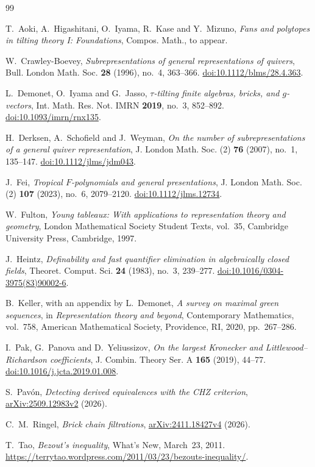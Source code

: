 \documentclass[a4paper,reqno,10pt]{amsart}
\theoremstyle{definition}
\numberwithin{equation}{section}
\begin{document}
\begin{thebibliography}{99}

T.~Aoki, A.~Higashitani, O.~Iyama, R.~Kase and Y.~Mizuno,
\emph{Fans and polytopes in tilting theory I: Foundations},
Compos. Math., to appear.

W.~Crawley-Boevey,
\emph{Subrepresentations of general representations of quivers},
Bull. London Math. Soc. \textbf{28} (1996), no.~4, 363--366.
\href{https://doi.org/10.1112/blms/28.4.363}{doi:10.1112/blms/28.4.363}.

L.~Demonet, O.~Iyama and G.~Jasso,
\emph{$\tau$-tilting finite algebras, bricks, and $g$-vectors},
Int. Math. Res. Not. IMRN \textbf{2019}, no.~3, 852--892.
\href{https://doi.org/10.1093/imrn/rnx135}{doi:10.1093/imrn/rnx135}.

H.~Derksen, A.~Schofield and J.~Weyman,
\emph{On the number of subrepresentations of a general quiver representation},
J. London Math. Soc. (2) \textbf{76} (2007), no.~1, 135--147.
\href{https://doi.org/10.1112/jlms/jdm043}{doi:10.1112/jlms/jdm043}.

J.~Fei,
\emph{Tropical $F$-polynomials and general presentations},
J. London Math. Soc. (2) \textbf{107} (2023), no.~6, 2079--2120.
\href{https://doi.org/10.1112/jlms.12734}{doi:10.1112/jlms.12734}.

W.~Fulton,
\emph{Young tableaux: With applications to representation theory and geometry},
London Mathematical Society Student Texts, vol.~35,
Cambridge University Press, Cambridge, 1997.

J.~Heintz,
\emph{Definability and fast quantifier elimination in algebraically closed fields},
Theoret. Comput. Sci. \textbf{24} (1983), no.~3, 239--277.
\href{https://doi.org/10.1016/0304-3975(83)90002-6}{doi:10.1016/0304-3975(83)90002-6}.

B.~Keller, with an appendix by L.~Demonet,
\emph{A survey on maximal green sequences},
in \emph{Representation theory and beyond},
Contemporary Mathematics, vol.~758,
American Mathematical Society, Providence, RI, 2020, pp.~267--286.

I.~Pak, G.~Panova and D.~Yeliussizov,
\emph{On the largest Kronecker and Littlewood--Richardson coefficients},
J. Combin. Theory Ser. A \textbf{165} (2019), 44--77.
\href{https://doi.org/10.1016/j.jcta.2019.01.008}{doi:10.1016/j.jcta.2019.01.008}.

S.~Pav\'on,
\emph{Detecting derived equivalences with the CHZ criterion},
\href{https://arxiv.org/abs/2509.12983v2}{arXiv:2509.12983v2} (2026).

C.~M.~Ringel,
\emph{Brick chain filtrations},
\href{https://arxiv.org/abs/2411.18427v4}{arXiv:2411.18427v4} (2026).

T.~Tao,
\emph{Bezout's inequality}, What's New, March~23, 2011.
\url{https://terrytao.wordpress.com/2011/03/23/bezouts-inequality/}.

\end{thebibliography}
\end{document}
